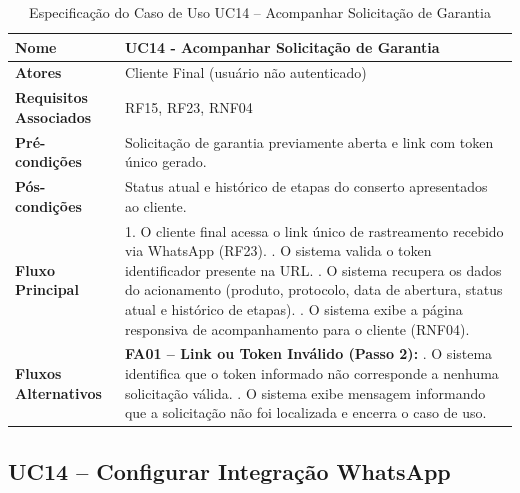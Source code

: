 \begin{table}[H]
	\centering
	\caption{Especificação do Caso de Uso UC14 – Acompanhar Solicitação de Garantia}
	\label{tab:uc14}
	\begin{tabular}{|p{3.5cm}|p{11.5cm}|}
		\hline
		\textbf{Nome} & UC14 - Acompanhar Solicitação de Garantia \\ \hline
		\textbf{Atores} & Cliente Final (usuário não autenticado) \\ \hline
		\textbf{Requisitos Associados} & RF15, RF23, RNF04 \\ \hline
		\textbf{Pré-condições} & Solicitação de garantia previamente aberta e link com token único gerado. \\ \hline
		\textbf{Pós-condições} & Status atual e histórico de etapas do conserto apresentados ao cliente. \\ \hline
		\textbf{Fluxo Principal} & 
		1. O cliente final acessa o link único de rastreamento recebido via WhatsApp (RF23). \newline
		2. O sistema valida o token identificador presente na URL. \newline
		3. O sistema recupera os dados do acionamento (produto, protocolo, data de abertura, status atual e histórico de etapas). \newline
		4. O sistema exibe a página responsiva de acompanhamento para o cliente (RNF04). \\ \hline
		\textbf{Fluxos Alternativos} & 
		\textbf{FA01 – Link ou Token Inválido (Passo 2):} \newline
		1. O sistema identifica que o token informado não corresponde a nenhuma solicitação válida. \newline
		2. O sistema exibe mensagem informando que a solicitação não foi localizada e encerra o caso de uso. \\ \hline
	\end{tabular}
\end{table}

\subsection{UC14 – Configurar Integração WhatsApp}

